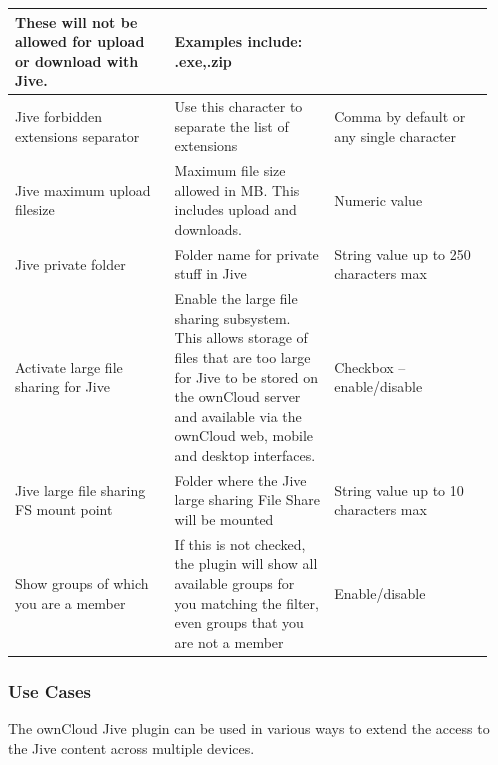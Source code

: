 \documentclass[letterpaper,10pt,english]{sphinxmanual}
\begin{document}
\begin{tabular}{|p{0.317\linewidth}|p{0.317\linewidth}|p{0.317\linewidth}|}
These will not be allowed for upload or download with Jive.
 & 
Examples include: .exe,.zip
\\
\hline
Jive forbidden extensions separator
 & 
Use this character to separate the list of extensions
 & 
Comma by default or any single character
\\
\hline
Jive maximum upload filesize
 & 
Maximum file size allowed in MB. This includes upload and downloads.
 & 
Numeric value
\\
\hline
Jive private folder
 & 
Folder name for private stuff in Jive
 & 
String value up to 250 characters max
\\
\hline
Activate large file sharing for Jive
 & 
Enable the large file sharing subsystem. This allows storage of files that are too large for Jive to be stored on the ownCloud server and available via the ownCloud web, mobile and desktop interfaces.
 & 
Checkbox – enable/disable
\\
\hline
Jive large file sharing FS mount point
 & 
Folder where the Jive large sharing File Share will be mounted
 & 
String value up to 10 characters max
\\
\hline
Show groups of which you are a member
 & 
If this is not checked, the plugin will show all available groups for you matching the filter, even groups that you are not a member
 & 
Enable/disable
\\
\hline\end{tabular}



\subsubsection{Use Cases}
\label{enterprise_external_storage/jive_configuration:use-cases}
The ownCloud Jive plugin can be used in various ways to extend the access to the Jive content across multiple devices.
\end{document}
